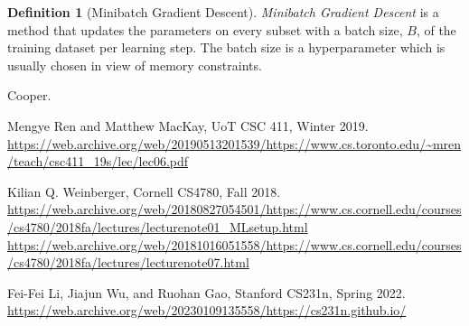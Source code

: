 \documentclass[11pt]{article}
\numberwithin{equation}{section}
\theoremstyle{definition}%
\newtheorem{definition}{Definition}[section]%
\begin{document}
\begin{definition}[Minibatch Gradient Descent]
    \emph{Minibatch Gradient Descent} is a method that updates the parameters on every subset with a batch size, $B$, of the training dataset per learning step. The batch size is a hyperparameter which is usually chosen in view of memory constraints. %
\end{definition}

\begin{thebibliography}{2}
     Cooper.

     Mengye Ren and Matthew MacKay, UoT CSC 411, Winter 2019. \url{https://web.archive.org/web/20190513201539/https://www.cs.toronto.edu/~mren/teach/csc411_19s/lec/lec06.pdf}

     Kilian Q. Weinberger, Cornell CS4780, Fall 2018.
    \url{https://web.archive.org/web/20180827054501/https://www.cs.cornell.edu/courses/cs4780/2018fa/lectures/lecturenote01_MLsetup.html}
     \url{https://web.archive.org/web/20181016051558/https://www.cs.cornell.edu/courses/cs4780/2018fa/lectures/lecturenote07.html}

     Fei-Fei Li, Jiajun Wu, and Ruohan Gao, Stanford CS231n, Spring 2022. \url{https://web.archive.org/web/20230109135558/https://cs231n.github.io/}

\end{thebibliography}
\end{document}
